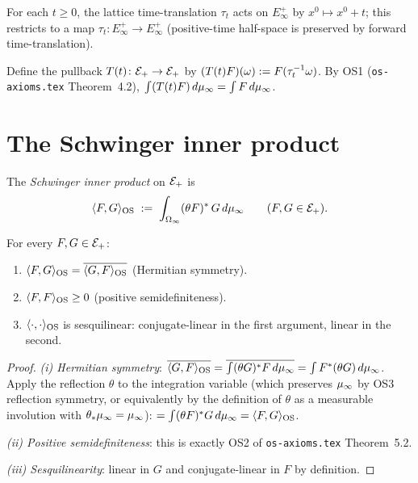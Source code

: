For each $t \ge 0$, the lattice time-translation $\tau_t$ acts on
$E_\infty^+$ by $x^0 \mapsto x^0 + t$; this restricts to a map
$\tau_t \colon E_\infty^+ \to E_\infty^+$ (positive-time
half-space is preserved by forward time-translation).

Define the pullback $T(t) \colon \mathcal{E}_+ \to \mathcal{E}_+$ by
$(T(t) F)(\omega) := F(\tau_t^{-1} \omega)$.  By OS1
(\texttt{os-axioms.tex} Theorem~4.2),
$\int (T(t) F) \, d\mu_\infty = \int F \, d\mu_\infty$.

\section{The Schwinger inner product}
\label{sec:schwinger}

\begin{definition}
\label{def:schwinger}
The \emph{Schwinger inner product} on $\mathcal{E}_+$ is
\begin{equation*}
  \langle F, G \rangle_{\mathrm{OS}} \;:=\; \int_{\Omega_\infty} (\theta F)^* \, G \, d\mu_\infty
  \qquad (F, G \in \mathcal{E}_+).
\end{equation*}
\end{definition}

\begin{proposition}
\label{prop:schwinger-psd}
For every $F, G \in \mathcal{E}_+$:
\begin{enumerate}
  \item $\langle F, G \rangle_{\mathrm{OS}} = \overline{\langle G, F \rangle_{\mathrm{OS}}}$  (Hermitian symmetry).
  \item $\langle F, F \rangle_{\mathrm{OS}} \ge 0$  (positive semidefiniteness).
  \item $\langle \cdot, \cdot \rangle_{\mathrm{OS}}$ is sesquilinear: conjugate-linear in
    the first argument, linear in the second.
\end{enumerate}
\end{proposition}

\begin{proof}
\emph{(i) Hermitian symmetry}: $\overline{\langle G, F \rangle_{\mathrm{OS}}} =
\overline{\int (\theta G)^* F \, d\mu_\infty} = \int F^* (\theta G) \, d\mu_\infty$.
Apply the reflection $\theta$ to the integration variable (which
preserves $\mu_\infty$ by OS3 reflection symmetry, or equivalently by
the definition of $\theta$ as a measurable involution with
$\theta_* \mu_\infty = \mu_\infty$): $= \int (\theta F)^* G \, d\mu_\infty =
\langle F, G \rangle_{\mathrm{OS}}$.

\emph{(ii) Positive semidefiniteness}: this is exactly OS2 of
\texttt{os-axioms.tex} Theorem~5.2.

\emph{(iii) Sesquilinearity}: linear in $G$ and conjugate-linear in
$F$ by definition.
\end{proof}

